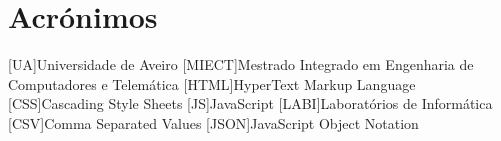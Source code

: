 \documentclass{report}
\begin{document}
\chapter*{Acrónimos}
\begin{acronym}
[UA]{Universidade de Aveiro}
[MIECT]{Mestrado Integrado em Engenharia de Computadores e Telemática}
[HTML]{HyperText Markup Language}
[CSS]{Cascading Style Sheets}
[JS]{JavaScript}
[LABI]{Laboratórios de Informática}
[CSV]{Comma Separated Values}
[JSON]{JavaScript Object Notation}
\end{acronym}


\printbibliography
\end{document}
